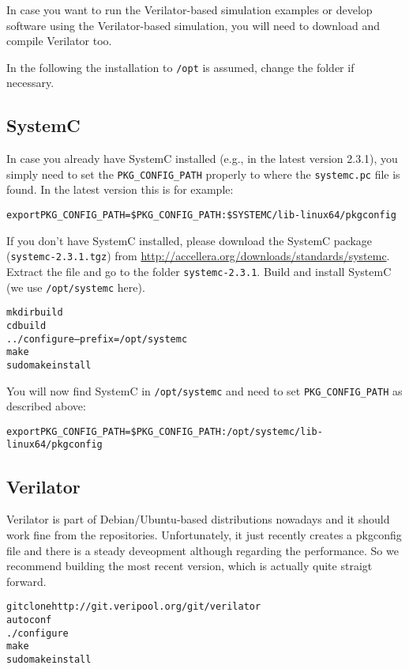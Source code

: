 In case you want to run the Verilator-based simulation examples or
develop software using the Verilator-based simulation, you will need
to download and compile Verilator too.

In the following the installation to \verb|/opt| is assumed, change
the folder if necessary.

\subsection{SystemC}

In case you already have SystemC installed (e.g., in the latest
version 2.3.1), you simply need to set the \verb|PKG_CONFIG_PATH|
properly to where the \verb|systemc.pc| file is found. In the latest
version this is for example:

\begin{alltt}
export PKG_CONFIG_PATH=\$PKG_CONFIG_PATH:\$SYSTEMC/lib-linux64/pkgconfig
\end{alltt}

If you don't have SystemC installed, please download the SystemC
package (\verb|systemc-2.3.1.tgz|) from
\url{http://accellera.org/downloads/standards/systemc}. Extract the
file and go to the folder \texttt{systemc-2.3.1}. Build and install
SystemC (we use \texttt{/opt/systemc} here).

\begin{alltt}
mkdir build
cd build
../configure --prefix=/opt/systemc
make
sudo make install
\end{alltt}

You will now find SystemC in \verb|/opt/systemc| and need to set
\verb|PKG_CONFIG_PATH| as described above:

\begin{alltt}
export PKG_CONFIG_PATH=\$PKG_CONFIG_PATH:/opt/systemc/lib-linux64/pkgconfig
\end{alltt}

\subsection{Verilator}

Verilator is part of Debian/Ubuntu-based distributions nowadays and it
should work fine from the repositories. Unfortunately, it just
recently creates a pkgconfig file and there is a steady deveopment
although regarding the performance. So we recommend building the most
recent version, which is actually quite straigt forward.

\begin{alltt}
git clone http://git.veripool.org/git/verilator
autoconf
./configure
make
sudo make install
\end{alltt}

